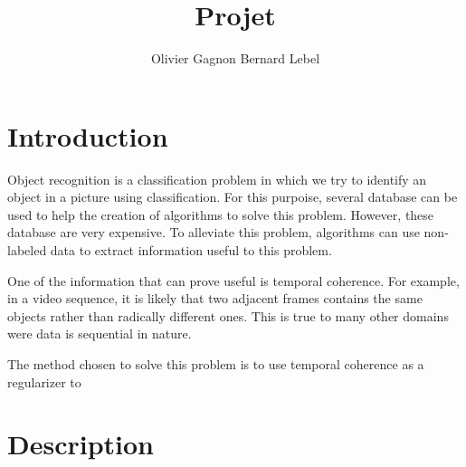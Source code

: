 \documentclass{article} %
\title{Projet}
\author{
Olivier Gagnon \And Bernard Lebel
}
\begin{document}
\maketitle

\begin{abstract}

\end{abstract}

\section{Introduction}

Object recognition is a classification problem in which we try to identify an object in a picture using classification. For this purpoise, several database can be used to help the creation of algorithms to solve this problem. However, these database are very expensive. To alleviate this problem, algorithms can use non-labeled data to extract information useful to this problem.

One of the information that can prove useful is temporal coherence. For example, in a video sequence, it is likely that two adjacent frames contains the same objects rather than radically different ones. This is true to many other domains were data is sequential in nature.

The method chosen to solve this problem is to use temporal coherence as a regularizer to 
\section{Description}
\end{document}
